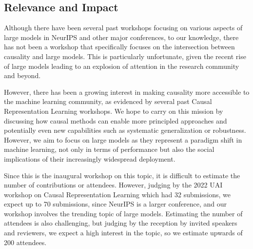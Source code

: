 \documentclass{article}
\begin{document}




\subsection{Relevance and Impact}

Although there have been several past workshops focusing on various aspects of large models in NeurIPS and other major conferences, to our knowledge, there has not been a workshop that specifically focuses on the intersection between causality and large models.
This is particularly unfortunate, given the recent rise of large models leading to an explosion of attention in the research community and beyond. 

However, there has been a growing interest in making causality more accessible to the machine learning community, as evidenced by several past Causal Representation Learning workshops. We hope to carry on this mission by discussing how causal methods can enable more principled approaches and potentially even new capabilities such as systematic generalization or robustness. However, we aim to focus on large models as they represent a paradigm shift in machine learning, not only in terms of performance but also the social implications of their increasingly widespread deployment.

Since this is the inaugural workshop on this topic, it is difficult to estimate the number of contributions or attendees. However, judging by the 2022 UAI workshop on Causal Representation Learning which had 32 submissions, we expect up to 70 submissions, since NeurIPS is a larger conference, and our workshop involves the trending topic of large models. Estimating the number of attendees is also challenging, but judging by the reception by invited speakers and reviewers, we expect a high interest in the topic, so we estimate upwards of 200 attendees.




\end{document}
